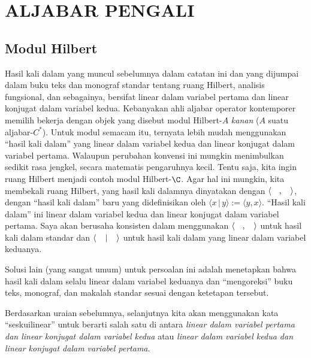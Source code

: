 \chapter{ALJABAR PENGALI}\label{multiplier_algebras}

\section{Modul Hilbert}
\begin{notn}\label{0038014} Hasil kali dalam yang muncul sebelumnya dalam catatan ini
dan yang dijumpai dalam buku teks dan monograf standar tentang ruang Hilbert,
analisis fungsional, dan sebagainya, bersifat linear dalam variabel pertama dan linear konjugat dalam
variabel kedua. Kebanyakan ahli aljabar operator kontemporer memilih bekerja dengan objek
yang disebut modul Hilbert-$A$ \emph{kanan} ($A$ suatu aljabar-$C^*$). Untuk modul semacam itu,
ternyata lebih mudah menggunakan ``hasil kali dalam'' yang linear dalam variabel kedua
dan linear konjugat dalam variabel pertama. Walaupun perubahan konvensi ini mungkin menimbulkan
sedikit rasa jengkel, secara matematis pengaruhnya kecil. Tentu saja,
kita ingin ruang Hilbert menjadi contoh modul Hilbert-$\C$. Agar hal ini
mungkin, kita membekali ruang Hilbert, yang hasil kali dalamnya dinyatakan dengan
$\langle\hphantom{X},\hphantom{X}\rangle$, dengan ``hasil kali dalam'' baru yang didefinisikan
oleh $\langle x\,\vert\,y\rangle := \langle y,x \rangle$. ``Hasil kali dalam'' ini linear
dalam variabel kedua dan linear konjugat dalam variabel pertama. Saya akan berusaha konsisten dalam
menggunakan $\langle\hphantom{X},\hphantom{X}\rangle$ untuk hasil kali dalam standar dan
$\langle\hphantom{X}\,\vert\,\hphantom{X}\rangle$ untuk hasil kali dalam yang linear dalam
variabel keduanya.

Solusi lain (yang sangat umum) untuk persoalan ini adalah menetapkan bahwa hasil kali dalam
selalu linear dalam variabel keduanya dan ``mengoreksi'' buku teks, monograf, dan
makalah standar sesuai dengan ketetapan tersebut.
\end{notn}

\begin{conv} Berdasarkan uraian sebelumnya, selanjutnya kita akan menggunakan kata
``seskuilinear'' untuk berarti salah satu di antara
\emph{linear dalam variabel pertama dan linear konjugat dalam variabel kedua} atau \emph{linear dalam
variabel kedua dan linear konjugat dalam variabel pertama}.
\end{conv}

